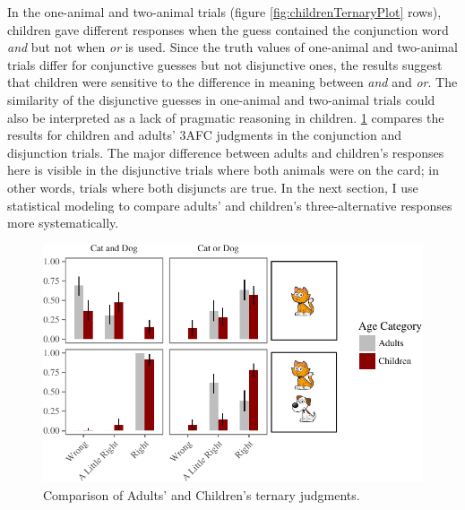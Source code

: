 \documentclass[oneside]{report}
\theoremstyle{definition}
\theoremstyle{definition}
\theoremstyle{definition}
\theoremstyle{remark}
\begin{document}
In the one-animal and two-animal trials (figure
\ref{fig:childrenTernaryPlot} rows), children gave different responses
when the guess contained the conjunction word \emph{and} but not when
\emph{or} is used. Since the truth values of one-animal and two-animal
trials differ for conjunctive guesses but not disjunctive ones, the
results suggest that children were sensitive to the difference in
meaning between \emph{and} and \emph{or}. The similarity of the
disjunctive guesses in one-animal and two-animal trials could also be
interpreted as a lack of pragmatic reasoning in children.
\ref{fig:childAdultComp} compares the results for children and adults'
3AFC judgments in the conjunction and disjunction trials. The major
difference between adults and children's responses here is visible in
the disjunctive trials where both animals were on the card; in other
words, trials where both disjuncts are true. In the next section, I use
statistical modeling to compare adults' and children's three-alternative
responses more systematically.
\begin{figure}[t]

{\centering \includegraphics{figs/childAdultComp-1} 

}

\caption{Comparison of Adults' and Children's ternary judgments.}\label{fig:childAdultComp}
\end{figure}
\end{document}
